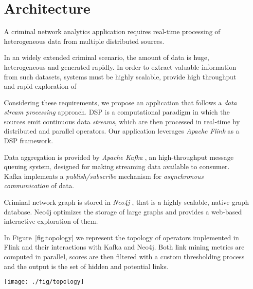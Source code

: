 \section{Architecture}
\label{sec:architecture}

A criminal network analytics application requires real-time processing of heterogeneous data from multiple distributed sources.

In an widely extended criminal scenario, the amount of data is  huge, heterogeneous and generated rapidly. In order to extract valuable information from such datasets, systems must be highly scalable, provide high throughput and rapid exploration of 

Considering these requirements, we propose an application that follows a \textit{data stream processing} approach. 
DSP is a computational paradigm in which the sources emit continuous data \textit{streams}, which are then processed in real-time by distributed and parallel operators.
Our application leverages \textit{Apache Flink} \cite{flink} as a DSP framework. 

Data aggregation is provided by \textit{Apache Kafka} \cite{kafka}, an high-throughput message queuing system, designed for making streaming data available to consumer. Kafka implements a \textit{publish/subscribe} mechanism for \textit{asynchronous communication} of data.

Criminal network graph is stored in \textit{Neo4j} \cite{neo4j}, that is a highly scalable, native graph database. Neo4j optimizes the storage of large graphs and provides a web-based interactive exploration of them.

In Figure~\ref{fig:topology} we represent the topology of operators implemented in Flink and their interactions with Kafka and Neo4j. Both link mining metrics are computed in parallel, scores are then filtered with a custom thresholding process and the output is the set of hidden and potential links.
 

\begin{figure*}
\centering
\texttt{[image: ./fig/topology]}
\caption{The topology of architecture.}
\label{fig:topology}
\end{figure*}

